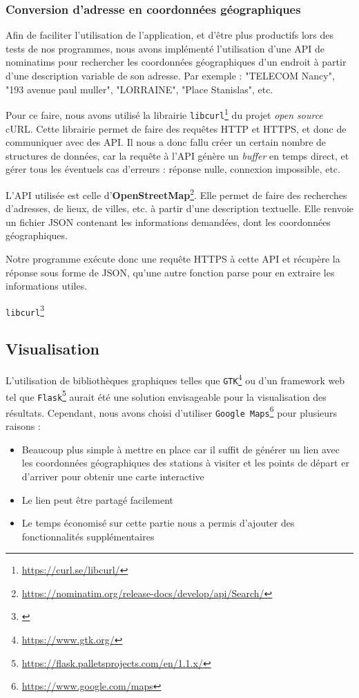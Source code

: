 \documentclass[a4paper, 12pt]{report}
\begin{document}
\subsubsection{Conversion d'adresse en coordonnées géographiques}
Afin de faciliter l'utilisation de l'application, et d'être plus productifs lors des tests de nos programmes, nous avons implémenté l'utilisation d'une API de nominatims pour rechercher les coordonnées géographiques d'un endroit à partir d'une description variable de son adresse. Par exemple : "TELECOM Nancy", "193 avenue paul muller", "LORRAINE", "Place Stanislas", etc.\par\bigskip
Pour ce faire, nous avons utilisé la librairie \texttt{libcurl}\footnote{\url{https://curl.se/libcurl/}} du projet \textit{open source} cURL. Cette librairie permet de faire des requêtes HTTP et HTTPS, et donc de communiquer avec des API. Il nous a donc fallu créer un certain nombre de structures de données, car la requête à l'API génère un \textit{buffer} en temps direct, et gérer tous les éventuels cas d'erreurs : réponse nulle, connexion impossible, etc.\par\bigskip
L'API utilisée est celle d'\textbf{OpenStreetMap}\footnote{\url{https://nominatim.org/release-docs/develop/api/Search/}}. Elle permet de faire des recherches d'adresses, de lieux, de villes, etc. à partir d'une description textuelle. Elle renvoie un fichier JSON contenant les informations demandées, dont les coordonnées géographiques.\par\bigskip
Notre programme exécute donc une requête HTTPS à cette API et récupère la réponse sous forme de JSON, qu'une autre fonction parse pour en extraire les informations utiles.\par\bigskip
\texttt{libcurl}\footnote{\url{}}
\subsection{Visualisation}
L'utilisation de bibliothèques graphiques telles que \texttt{GTK}\footnote{\url{https://www.gtk.org/}} ou d'un framework web tel que \texttt{Flask}\footnote{\url{https://flask.palletsprojects.com/en/1.1.x/}} aurait été une solution envisageable pour la visualisation des résultats. Cependant, nous avons choisi d'utiliser \texttt{Google Maps}\footnote{\url{https://www.google.com/maps}} pour plusieurs raisons :
\begin{itemize}
    \item Beaucoup plus simple à mettre en place car il suffit de générer un lien avec les coordonnées géographiques des stations à visiter et les points de départ er d'arriver pour obtenir une carte interactive
    \item Le lien peut être partagé facilement
    \item Le temps économisé sur cette partie nous a permis d'ajouter des fonctionnalités supplémentaires
\end{itemize}
\clearpage
\end{document}
